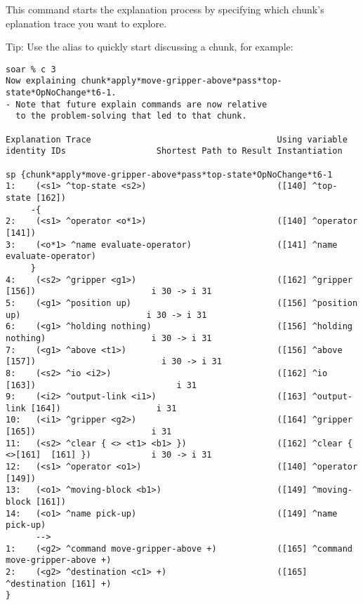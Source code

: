 \textbf{}

This command starts the explanation process by specifying which chunk's eplanation trace you want to explore.

Tip: Use the alias  to quickly start discussing a chunk, for example:

{\tiny
\begin{verbatim}
soar % c 3
Now explaining chunk*apply*move-gripper-above*pass*top-state*OpNoChange*t6-1.
- Note that future explain commands are now relative
  to the problem-solving that led to that chunk.

Explanation Trace                                     Using variable identity IDs                  Shortest Path to Result Instantiation

sp {chunk*apply*move-gripper-above*pass*top-state*OpNoChange*t6-1
1:    (<s1> ^top-state <s2>)                          ([140] ^top-state [162])
     -{
2:    (<s1> ^operator <o*1>)                          ([140] ^operator [141])
3:    (<o*1> ^name evaluate-operator)                 ([141] ^name evaluate-operator)
     }
4:    (<s2> ^gripper <g1>)                            ([162] ^gripper [156])                       i 30 -> i 31
5:    (<g1> ^position up)                             ([156] ^position up)                         i 30 -> i 31
6:    (<g1> ^holding nothing)                         ([156] ^holding nothing)                     i 30 -> i 31
7:    (<g1> ^above <t1>)                              ([156] ^above [157])                         i 30 -> i 31
8:    (<s2> ^io <i2>)                                 ([162] ^io [163])                            i 31
9:    (<i2> ^output-link <i1>)                        ([163] ^output-link [164])                   i 31
10:   (<i1> ^gripper <g2>)                            ([164] ^gripper [165])                       i 31
11:   (<s2> ^clear { <> <t1> <b1> })                  ([162] ^clear { <>[161]  [161] })            i 30 -> i 31
12:   (<s1> ^operator <o1>)                           ([140] ^operator [149])
13:   (<o1> ^moving-block <b1>)                       ([149] ^moving-block [161])
14:   (<o1> ^name pick-up)                            ([149] ^name pick-up)
      -->
1:    (<g2> ^command move-gripper-above +)            ([165] ^command move-gripper-above +)
2:    (<g2> ^destination <c1> +)                      ([165] ^destination [161] +)
}
\end{verbatim}
}

\textbf{}


